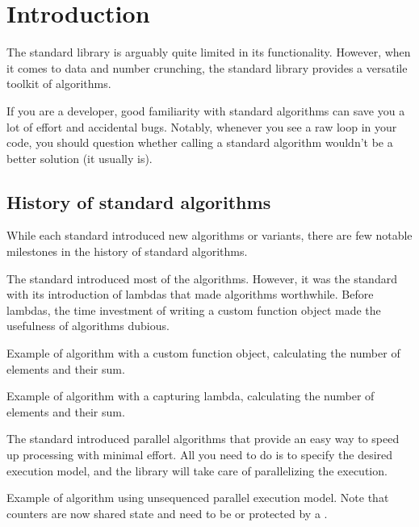 \chapter{Introduction}

The \CC standard library is arguably quite limited in its functionality. However, when it comes to data and number crunching, the \CC standard library provides a versatile toolkit of algorithms.

If you are a \CC developer, good familiarity with \CC standard algorithms can save you a lot of effort and accidental bugs. Notably, whenever you see a raw loop in your code, you should question whether calling a standard algorithm wouldn't be a better solution (it usually is).

\section{History of standard \texorpdfstring{\CC}{C++} algorithms}

While each \CC standard introduced new algorithms or variants, there are few notable milestones in the history of \CC standard algorithms.

The  standard introduced most of the algorithms. However, it was the  standard with its introduction of lambdas that made algorithms worthwhile. Before lambdas, the time investment of writing a custom function object made the usefulness of algorithms dubious.

\begin{box-note}
\footnotesize Example of  algorithm with a custom function object, calculating the number of elements and their sum.
\tcblower
{}
\end{box-note}

\begin{box-note}
\footnotesize Example of  algorithm with a capturing lambda, calculating the number of elements and their sum.
\tcblower
{}
\end{box-note}

The  standard introduced parallel algorithms that provide an easy way to speed up processing with minimal effort. All you need to do is to specify the desired execution model, and the library will take care of parallelizing the execution.

\begin{box-note}
\footnotesize Example of  algorithm using unsequenced parallel execution model. Note that counters are now shared state and need to be  or protected by a .
\tcblower
{}
\end{box-note}

